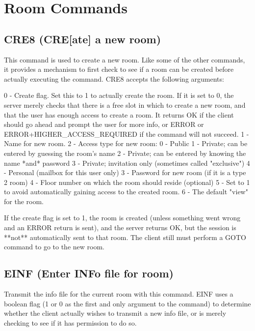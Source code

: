 \section{Room Commands}



\subsection{CRE8 (CRE[ate] a new room)}

 This command is used to create a new room.  Like some of the other
commands, it provides a mechanism to first check to see if a room can be
created before actually executing the command.  CRE8 accepts the following
arguments:

 0  -  Create flag.  Set this to 1 to actually create the room.  If it is
set to 0, the server merely checks that there is a free slot in which to
create a new room, and that the user has enough access to create a room.  It
returns OK if the client should go ahead and prompt the user for more info,
or ERROR or ERROR+HIGHER_ACCESS_REQUIRED if the command will not succeed.
 1  -  Name for new room.
 2  -  Access type for new room:
       0  -  Public
       1  -  Private; can be entered by guessing the room's name
       2  -  Private; can be entered by knowing the name *and* password
       3  -  Private; invitation only (sometimes called "exclusive")
       4  -  Personal (mailbox for this user only)
 3  -  Password for new room (if it is a type 2 room)
 4  -  Floor number on which the room should reside (optional)
 5  -  Set to 1 to avoid automatically gaining access to the created room.
 6  -  The default "view" for the room.

 If the create flag is set to 1, the room is created (unless something
went wrong and an ERROR return is sent), and the server returns OK, but
the session is **not** automatically sent to that room.  The client still
must perform a GOTO command to go to the new room.



\subsection{EINF (Enter INFo file for room)}

 Transmit the info file for the current room with this command.  EINF uses
a boolean flag (1 or 0 as the first and only argument to the command) to
determine whether the client actually wishes to transmit a new info file, or
is merely checking to see if it has permission to do so.

